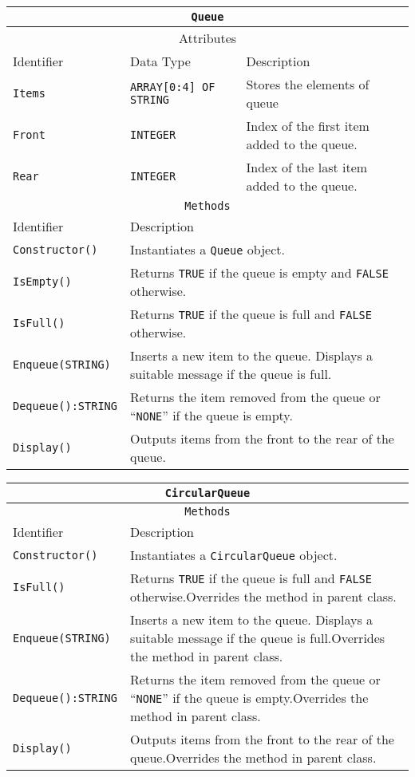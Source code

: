 \begin{center}
\begin{tabular}{|l|l|l|}
\hline 
\multicolumn{3}{|c|}{\texttt{Queue}}\tabularnewline
\hline 
\multicolumn{3}{|c|}{Attributes}\tabularnewline
\hline 
\texttt{\hspace{0.01\columnwidth}}Identifier & \texttt{\hspace{0.01\columnwidth}}Data Type & \texttt{\hspace{0.05\columnwidth}}Description\tabularnewline
\hline 
\texttt{Items} & \texttt{ARRAY{[}0:4{]} OF STRING} & Stores the elements of queue\tabularnewline
\hline 
\texttt{Front} & \texttt{INTEGER} & Index of the first item added to the queue.\tabularnewline
\hline 
\texttt{Rear} & \texttt{INTEGER} & Index of the last item added to the queue.\tabularnewline
\hline 
\multicolumn{3}{|c|}{\texttt{Methods}}\tabularnewline
\hline 
Identifier & \multicolumn{2}{l|}{Description}\tabularnewline
\hline 
\texttt{Constructor()} & \multicolumn{2}{l|}{Instantiates a \texttt{Queue} object.}\tabularnewline
\hline 
\texttt{IsEmpty()} & \multicolumn{2}{l|}{Returns \texttt{TRUE} if the queue is empty and \texttt{FALSE} otherwise.}\tabularnewline
\hline 
\texttt{IsFull()} & \multicolumn{2}{l|}{Returns \texttt{TRUE} if the queue is full and \texttt{FALSE} otherwise.}\tabularnewline
\hline 
\texttt{Enqueue(STRING)} & \multicolumn{2}{l|}{Inserts a new item to the queue. Displays a suitable message if the
queue is full.}\tabularnewline
\hline 
\texttt{Dequeue():STRING} & \multicolumn{2}{l|}{Returns the item removed from the queue or \textquotedblleft \texttt{NONE}\textquotedblright{}
if the queue is empty.}\tabularnewline
\hline 
\texttt{Display()} & \multicolumn{2}{l|}{Outputs items from the front to the rear of the queue.}\tabularnewline
\hline 
\end{tabular}
\par\end{center}

\begin{center}
\begin{tabular}{|l|l||l|}
\hline 
\multicolumn{3}{|c|}{\texttt{CircularQueue}}\tabularnewline
\hline 
\multicolumn{3}{|c|}{\texttt{Methods}}\tabularnewline
\hline 
Identifier & \multicolumn{2}{l|}{Description}\tabularnewline
\hline 
\texttt{Constructor()} & \multicolumn{2}{l|}{Instantiates a \texttt{CircularQueue} object.}\tabularnewline
\hline 
\texttt{IsFull()} & \multicolumn{2}{l|}{Returns \texttt{TRUE} if the queue is full and \texttt{FALSE} otherwise.Overrides
the method in parent class.}\tabularnewline
\hline 
\texttt{Enqueue(STRING)} & \multicolumn{2}{l|}{Inserts a new item to the queue. Displays a suitable message if the
queue is full.Overrides the method in parent class.}\tabularnewline
\hline 
\texttt{Dequeue():STRING} & \multicolumn{2}{l|}{Returns the item removed from the queue or \textquotedblleft \texttt{NONE}\textquotedblright{}
if the queue is empty.Overrides the method in parent class.}\tabularnewline
\hline 
\texttt{Display()} & \multicolumn{2}{l|}{Outputs items from the front to the rear of the queue.Overrides the
method in parent class.}\tabularnewline
\hline 
\end{tabular}
\par\end{center}

